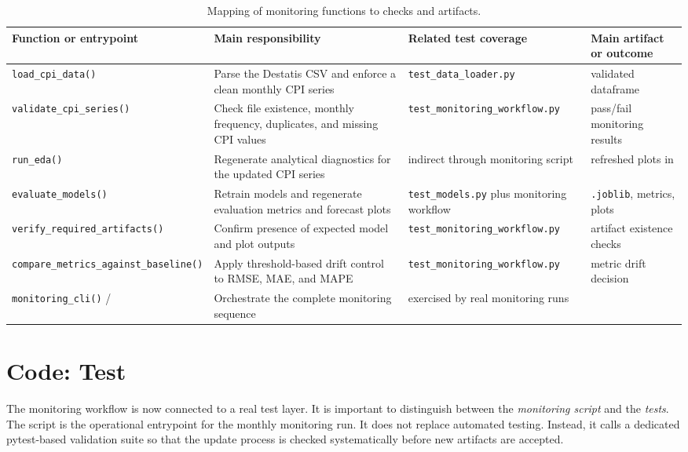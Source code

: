 \begin{table}[htbp]
    \centering
    \caption{Mapping of monitoring functions to checks and artifacts.}
    \label{tab:monitoring-function-map}
    {\small
    \renewcommand{\arraystretch}{1.18}
    \setlength{\tabcolsep}{6pt}
    \begin{tabular}{L{3.8cm}L{4.4cm}L{3.0cm}L{3.0cm}}
        \hline
        Function or entrypoint & Main responsibility & Related test coverage & Main artifact or outcome \\
        \hline
        \texttt{load\_cpi\_data()} & Parse the Destatis CSV and enforce a clean monthly CPI series & \texttt{test\_data\_loader.py} & validated dataframe \\
        \texttt{validate\_cpi\_series()} & Check file existence, monthly frequency, duplicates, and missing CPI values & \texttt{test\_monitoring\_workflow.py} & pass/fail monitoring results \\
        \texttt{run\_eda()} & Regenerate analytical diagnostics for the updated CPI series & indirect through monitoring script & refreshed plots in  \\
        \texttt{evaluate\_models()} & Retrain models and regenerate evaluation metrics and forecast plots & \texttt{test\_models.py} plus monitoring workflow & \texttt{.joblib}, metrics, plots \\
        \texttt{verify\_required\_artifacts()} & Confirm presence of expected model and plot outputs & \texttt{test\_monitoring\_workflow.py} & artifact existence checks \\
        \texttt{compare\_metrics\_against\_baseline()} & Apply threshold-based drift control to RMSE, MAE, and MAPE & \texttt{test\_monitoring\_workflow.py} & metric drift decision \\
        \texttt{monitoring\_cli()} /  & Orchestrate the complete monitoring sequence & exercised by real monitoring runs &  \\
        \hline
    \end{tabular}
    }
\end{table}

\section{Code: Test}

The monitoring workflow is now connected to a real test layer. It is important to distinguish between the \emph{monitoring script} and the \emph{tests}. The script  is the operational entrypoint for the monthly monitoring run. It does not replace automated testing. Instead, it calls a dedicated pytest-based validation suite so that the update process is checked systematically before new artifacts are accepted.

